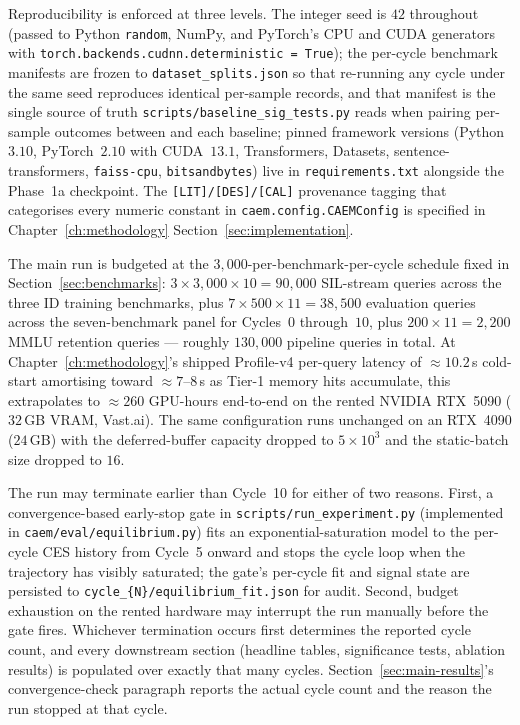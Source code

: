 Reproducibility is enforced at three levels. The integer seed is $42$ throughout (passed to Python \texttt{random}, NumPy, and PyTorch's CPU and CUDA generators with \texttt{torch.backends.cudnn.deterministic = True}); the per-cycle benchmark manifests are frozen to \texttt{dataset\_splits.json} so that re-running any cycle under the same seed reproduces identical per-sample records, and that manifest is the single source of truth \texttt{scripts/baseline\_sig\_tests.py} reads when pairing per-sample outcomes between \caem{} and each baseline; pinned framework versions (Python~$3.10$, PyTorch~$2.10$ with CUDA~$13.1$, Transformers, Datasets, sentence-transformers, \texttt{faiss-cpu}, \texttt{bitsandbytes}) live in \texttt{requirements.txt} alongside the Phase~1a checkpoint. The \texttt{[LIT]/[DES]/[CAL]} provenance tagging that categorises every numeric constant in \texttt{caem.config.CAEMConfig} is specified in Chapter~\ref{ch:methodology} Section~\ref{sec:implementation}.

The main run is budgeted at the $3{,}000$-per-benchmark-per-cycle schedule fixed in Section~\ref{sec:benchmarks}: $3 \times 3{,}000 \times 10 = 90{,}000$ SIL-stream queries across the three ID training benchmarks, plus $7 \times 500 \times 11 = 38{,}500$ evaluation queries across the seven-benchmark panel for Cycles~$0$ through~$10$, plus $200 \times 11 = 2{,}200$ MMLU retention queries --- roughly $130{,}000$ pipeline queries in total. At Chapter~\ref{ch:methodology}'s shipped Profile-v4 per-query latency of $\approx 10.2$\,s cold-start amortising toward $\approx 7$--$8$\,s as Tier-1 memory hits accumulate, this extrapolates to $\approx 260$ GPU-hours end-to-end on the rented NVIDIA RTX~5090 ($32$\,GB VRAM, Vast.ai). The same configuration runs unchanged on an RTX~4090 ($24$\,GB) with the deferred-buffer capacity dropped to $5 \times 10^{3}$ and the static-batch size dropped to $16$.

The run may terminate earlier than Cycle~10 for either of two reasons. First, a convergence-based early-stop gate in \texttt{scripts/run\_experiment.py} (implemented in \texttt{caem/eval/equilibrium.py}) fits an exponential-saturation model to the per-cycle CES history from Cycle~5 onward and stops the cycle loop when the trajectory has visibly saturated; the gate's per-cycle fit and signal state are persisted to \texttt{cycle\_\{N\}/equilibrium\_fit.json} for audit. Second, budget exhaustion on the rented hardware may interrupt the run manually before the gate fires. Whichever termination occurs first determines the reported cycle count, and every downstream section (headline tables, significance tests, ablation results) is populated over exactly that many cycles. Section~\ref{sec:main-results}'s convergence-check paragraph reports the actual cycle count and the reason the run stopped at that cycle.


